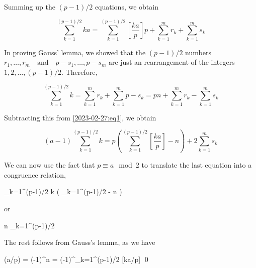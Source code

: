 Summing up the $(p-1)/2$ equations, we obtain

\begin{equation}\label{2023-02-27:eq1}
    \sum_{k=1}^{(p-1)/2} ka = \sum_{k=1}^{(p-1)/2} \left[ \frac{ka}{p} \right] p + \sum_{k=1}^m r_k + \sum_{k=1}^m s_k
\end{equation}

In proving Gauss' lemma, we showed that the $(p-1)/2$ numbers $r_1, \ldots, r_m \quad \text{and} \quad p - s_1, \ldots, p - s_m$ are just an rearrangement of the integers $1, 2, \ldots, (p-1)/2$. Therefore,

\begin{equation*}
    \sum_{k=1}^{(p-1)/2} k  = \sum_{k=1}^m r_k + \sum_{k=1}^m p - s_k = pn + \sum_{k=1}^m r_k - \sum_{k=1}^m s_k
\end{equation*}

Subtracting this from \eqref{2023-02-27:eq1}, we obtain

\begin{equation*}
    (a-1) \sum_{k=1}^{(p-1)/2} k = p \left( \sum_{k=1}^{(p-1)/2} \left[ \frac{ka}{p} \right] - n \right) + 2\sum_{k=1}^m s_k 
\end{equation*}

We can now use the fact that $p \equiv a \mod 2$ to translate the last equation into a congruence relation,

 \cdot \sum_{k=1}^{(p-1)/2} k  \cdot \left( \sum_{k=1}^{(p-1)/2}  - n \right)
\eee

or

\bee
n \equiv \sum_{k=1}^{(p-1)/2}  
\eee

The rest follows from Gauss's lemma, as we have

\bee
(a/p) = (-1)^n = (-1)^{\sum_{k=1}^{(p-1)/2} [ka/p]} \qed
\eee

